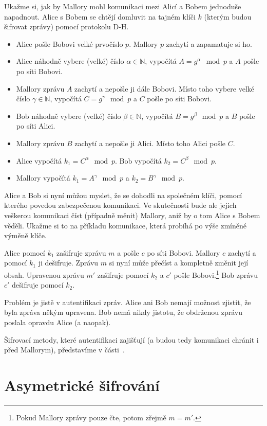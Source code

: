 \documentclass[
  program=infoi,
  biblatex,
  figures=false,
  glossaries,
  index
]{kidiplom}
\begin{document}
    \bigskip

    Ukažme si, jak by Mallory mohl komunikaci mezi Alicí a Bobem jednoduše napadnout.
    Alice s Bobem se chtějí domluvit na tajném klíči $k$ (kterým budou šifrovat zprávy) pomocí protokolu D-H.

        \begin{itemize}
            \item
                Alice pošle Bobovi velké prvočíslo $p$.
                Mallory $p$ zachytí a zapamatuje si ho.
            \item
                Alice náhodně vybere (velké) číslo $\alpha \in \mathbb{N}$, vypočítá $A=g^\alpha \mod{p}$ a $A$ pošle po síti Bobovi.
            \item
                Mallory zprávu $A$ zachytí a nepošle ji dále Bobovi. Místo toho vybere velké číslo $\gamma \in \mathbb{N}$,
                vypočítá $C=g^\gamma \mod{p}$ a $C$ pošle po síti Bobovi.
            \item
                Bob náhodně vybere (velké) číslo $\beta \in \mathbb{N}$, vypočítá $B=g^\beta \mod{p}$ a $B$ pošle po síti Alici.
            \item
                Mallory zprávu $B$ zachytí a nepošle ji Alici. Místo toho Alici pošle $C$.
            \item
                Alice vypočítá $k_1=C^\alpha \mod{p}$. Bob vypočítá $k_2=C^\beta \mod{p}$.
            \item
                Mallory vypočítá $k_1=A^\gamma \mod{p}$ a $k_2=B^\gamma \mod{p}$.

        \end{itemize}


        Alice a Bob si nyní můžou myslet, že se dohodli na společném klíči, pomocí kterého povedou zabezpečenou komunikaci.
        Ve skutečnosti bude ale jejich veškerou komunikaci číst (případně měnit) Mallory, aniž by o tom Alice s Bobem věděli.
        Ukažme si to na příkladu komunikace, která probíhá po výše zmíněné výměně klíče.

        Alice pomocí $k_1$ zašifruje zprávu $m$ a pošle $c$ po síti Bobovi. Mallory $c$ zachytí a pomocí $k_1$ ji dešifruje.
        Zprávu $m$ si nyní může přečíst a kompletně změnit její obsah.
        Upravenou zprávu $m'$ zašifruje pomocí $k_2$ a $c'$ pošle Bobovi.\footnote{Pokud Mallory zprávy pouze čte, potom zřejmě $m = m'$.}
        Bob zprávu $c'$ dešifruje pomocí $k_2$.

        Problém je jistě v autentifikaci zpráv. Alice ani Bob nemají možnost zjistit, že byla zpráva někým upravena.
        Bob nemá nikdy jistotu, že obdrženou zprávu poslala opravdu Alice (a naopak).

        \medskip

        Šifrovací metody, které autentifikaci zajišťují (a budou tedy komunikaci chránit i před Mallorym), představíme v části~\ref{public-key}.

    \newpage
    
\part{Asymetrické šifrování}\label{public-key}
\end{document}
